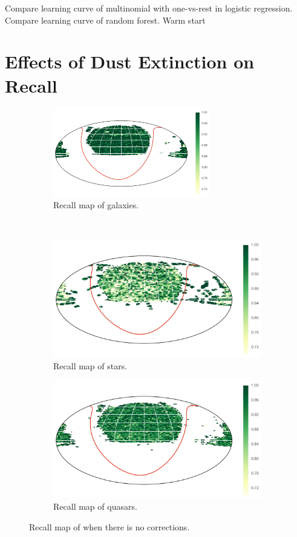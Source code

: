 Compare learning curve of multinomial with one-vs-rest in logistic regression.
Compare learning curve of random forest. Warm start


\section{Effects of Dust Extinction on Recall}

\begin{figure}[p]
	\centering
	\begin{subfigure}{\textwidth}
		\centering
		\includegraphics[width=0.75\textwidth]{figures/appendix/map_recall_uncorrected_Galaxy}
		\caption{Recall map of galaxies.}
		\label{fig:map_recall_uncorrected_galaxies}
	\end{subfigure}\\
	\begin{subfigure}{\textwidth}
		\centering
		\includegraphics[width=0.75\linewidth]{figures/appendix/map_recall_uncorrected_Star}
		\caption{Recall map of stars.}
		\label{fig:map_recall_uncorrected_stars}
	\end{subfigure}
	\begin{subfigure}{\textwidth}
		\centering
		\includegraphics[width=0.75\linewidth]{figures/appendix/map_recall_uncorrected_Quasar}
		\caption{Recall map of quasars.}
		\label{fig:map_recall_uncorrected_quasars}
	\end{subfigure}
	\caption{Recall map of when there is no corrections.}
	\label{fig:map_recall_uncorrected}
\end{figure}



